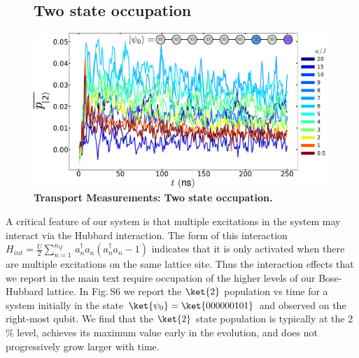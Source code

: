 \begin{figure}[tbh]
    \subsection{Two state occupation}
    \centering
    \includegraphics[width=150mm, keepaspectratio]{./PDF/fs6_190919_1238p.pdf}
    \caption{\textbf{Transport Measurements:  Two state occupation.}
    }\end{figure}
    A critical feature of our system is that multiple excitations in the system may interact via the Hubbard interaction.
    The form of this interaction
    $H_{int} = \frac{U}{2}\sum\limits_{n=1}^{n_{Q}} \,a^{\dagger}_{n}a_n(a^{\dagger}_{n}a_n-1)$
    indicates that it is only activated when there are multiple excitations on the same lattice site.
    Thus the interaction effects that we report in the main text require occupation of the higher levels of our Bose-Hubbard lattice.
    In Fig.\,S6 we report the $\ket{2}$ population vs time for a system initially in the state $\ket{\psi_0}=\ket{000000101}$ and observed on the right-most qubit.
    We find that the $\ket{2}$ state population is typically at the 2 \% level,
    achieves its maximum value early in the evolution, and does not progressively grow larger with time.

